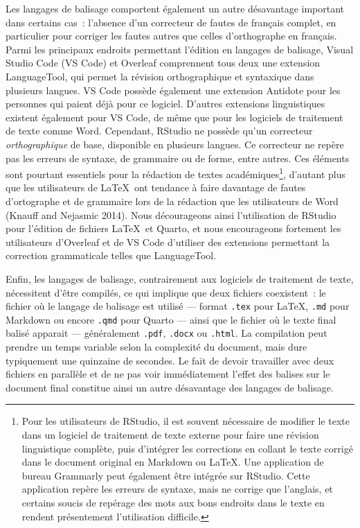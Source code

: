 \documentclass[
  letterpaper,
]{scrbook}
\begin{document}
Les langages de balisage comportent également un autre désavantage
important dans certains cas~: l'absence d'un correcteur de fautes de
français complet, en particulier pour corriger les fautes autres que
celles d'orthographe en français. Parmi les principaux endroits
permettant l'édition en langages de balisage, Visual Studio Code (VS
Code) et Overleaf comprennent tous deux une extension LanguageTool, qui
permet la révision orthographique et syntaxique dans plusieurs langues.
VS Code possède également une extension Antidote pour les personnes qui
paient déjà pour ce logiciel. D'autres extensions linguistiques existent
également pour VS Code, de même que pour les logiciels de traitement de
texte comme Word. Cependant, RStudio ne possède qu'un correcteur
\emph{orthographique} de base, disponible en plusieurs langues. Ce
correcteur ne repère pas les erreurs de syntaxe, de grammaire ou de
forme, entre autres. Ces éléments sont pourtant essentiels pour la
rédaction de textes académiques\footnote{Pour les utilisateurs de
  RStudio, il est souvent nécessaire de modifier le texte dans un
  logiciel de traitement de texte externe pour faire une révision
  linguistique complète, puis d'intégrer les corrections en collant le
  texte corrigé dans le document original en Markdown ou \LaTeX. Une
  application de bureau Grammarly peut également être intégrée sur
  RStudio. Cette application repère les erreurs de syntaxe, mais ne
  corrige que l'anglais, et certains soucis de repérage des mots aux
  bons endroits dans le texte en rendent présentement l'utilisation
  difficile.}, d'autant plus que les utilisateurs de \LaTeX~ont tendance
à faire davantage de fautes d'ortographe et de grammaire lors de la
rédaction que les utilisateurs de Word (Knauff and Nejasmic 2014). Nous
décourageons ainsi l'utilisation de RStudio pour l'édition de fichiers
\LaTeX~et Quarto, et nous encourageons fortement les utilisateurs
d'Overleaf et de VS Code d'utiliser des extensions permettant la
correction grammaticale telles que LanguageTool.

Enfin, les langages de balisage, contrairement aux logiciels de
traitement de texte, nécessitent d'être compilés, ce qui implique que
deux fichiers coexistent~: le fichier où le langage de balisage est
utilisé --- format \texttt{.tex} pour \LaTeX, \texttt{.md} pour Markdown
ou encore \texttt{.qmd} pour Quarto --- ainsi que le fichier où le texte
final balisé apparait --- généralement \texttt{.pdf}, \texttt{.docx} ou
\texttt{.html}. La compilation peut prendre un temps variable selon la
complexité du document, mais dure typiquement une quinzaine de secondes.
Le fait de devoir travailler avec deux fichiers en parallèle et de ne
pas voir immédiatement l'effet des balises sur le document final
constitue ainsi un autre désavantage des langages de balisage.
\end{document}
